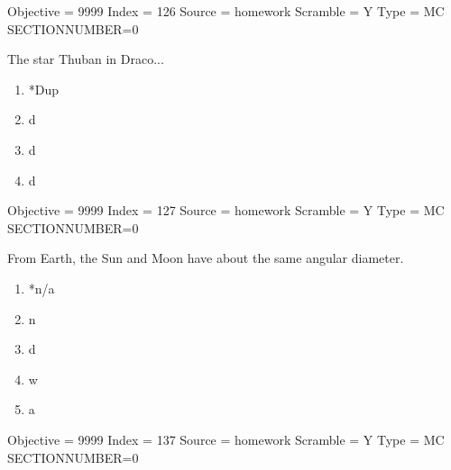 \documentclass[11pt]{article}
\begin{document}
\begin{enumerate}
\begin{minipage}{\textwidth}
\begin{minipage}{\textwidth}
Objective = 9999
Index = 126
Source = homework
Scramble = Y
Type = MC
SECTIONNUMBER=0
\end{minipage}
\end{minipage}
\vskip 0.20in

\begin{minipage}{\textwidth}
\begin{minipage}{\textwidth}
\item The star Thuban in Draco...
\begin{multicols}{3}
\begin{enumerate} 
\setlength{\itemsep}{1pt} 
\setlength{\parskip}{0pt} 
\setlength{\parsep}{0pt}
\setlength{\multicolsep}{1pt} 
\item *Dup
\item d
\item d
\item d
\end{enumerate} 
\vfill 
\end{multicols}

Objective = 9999
Index = 127
Source = homework
Scramble = Y
Type = MC
SECTIONNUMBER=0
\end{minipage}
\end{minipage}
\vskip 0.20in

\begin{minipage}{\textwidth}
\begin{minipage}{\textwidth}
\item From Earth, the Sun and Moon have about the same angular diameter.
\begin{multicols}{3}
\begin{enumerate} 
\setlength{\itemsep}{1pt} 
\setlength{\parskip}{0pt} 
\setlength{\parsep}{0pt}
\setlength{\multicolsep}{1pt} 
\item *n/a
\item n
\item d
\item w
\item a
\end{enumerate} 
\vfill 
\end{multicols}

Objective = 9999
Index = 137
Source = homework
Scramble = Y
Type = MC
SECTIONNUMBER=0
\end{minipage}
\end{minipage}
\vskip 0.20in


\end{enumerate}
\end{document}
